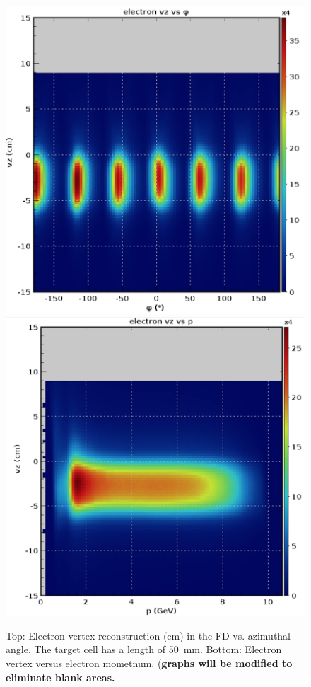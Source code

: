 \documentclass[final,3p,twocolumn]{elsarticle}
\begin{document}
\begin{figure}[ht!]
\includegraphics[width=0.9\columnwidth]{e-vz-phi}
\includegraphics[width=0.9\columnwidth]{e-vz-p}
\caption{Top: Electron vertex reconstruction (cm) in the FD vs. azimuthal angle. The target
  cell has a length of 50~mm. Bottom: Electron vertex versus electron mometnum. ({\bf graphs will be modified to 
  eliminate blank areas.}} 
\label{vertex}
\end{figure}
\end{document}
